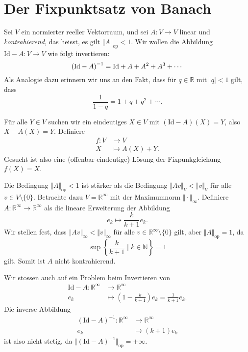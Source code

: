 \documentclass[../main.tex]{subfiles}
\begin{document}
\section{Der Fixpunktsatz von Banach}
\begin{motivation}
  Sei $V$ ein normierter reeller Vektorraum,
  und sei $A \colon V \to V$ linear und \emph{kontrahierend},
  das heisst, es gilt
  $\Vert A \Vert_{\text{op}} < 1$.
  Wir wollen die Abbildung $\text{Id} - A \colon V \to V$ wie folgt
  invertieren:
  \[
    {(\text{Id} - A)}^{-1} = \textup{Id} + A + A^2 + A^3 + \cdots
  \]
  Als Analogie dazu erinnern wir uns an den Fakt, dass
  für $q \in \mathbb{R}$ mit $|q| < 1$ gilt, dass
  \[
    \frac{1}{1-q} = 1 + q + q^2 + \cdots.
  \]

  Für alle $Y \in V$ suchen wir ein eindeutiges $X \in V$
  mit $(\text{Id} - A)(X) = Y$, also
  $X - A(X) = Y$.
  Definiere
  \begin{align*}
    f \colon V & \to V \\
    X & \mapsto A(X) + Y.
  \end{align*}
  Gesucht ist also eine (offenbar eindeutige) Lösung
  der Fixpunkgleichung $f(X) = X$.
\end{motivation}

\begin{remark}
  Die Bedingung $\Vert A \Vert_{\text{op}} < 1$ ist stärker als die
  Bedingung $\Vert A v \Vert_V < \Vert v \Vert_V$ für alle $v
  \in V \setminus \{0\}$.
  Betrachte dazu $V = \mathbb{R}^{\infty}$ mit der Maximumnorm
  $\Vert \cdot \Vert_{\infty}$.
  Definiere $A \colon \mathbb{R}^{\infty} \to \mathbb{R}^{\infty}$
  als die lineare Erweiterung der Abbildung
  \[
    e_k \mapsto \frac{k}{k+1}e_k.
  \]
  Wir stellen fest, dass $\Vert A v \Vert_{\infty} < \Vert v \Vert_{\infty}$
  für alle $v \in \mathbb{R}^{\infty} \setminus \{0\}$ gilt,
  aber $\Vert A \Vert_{\text{op}} = 1$, da
  \[
    \sup \left\{\frac{k}{k+1} \mid k \in \mathbb{N}\right\} = 1
  \]
  gilt. Somit ist $A$ nicht kontrahierend.

  Wir stossen auch auf ein Problem beim Invertieren von
  \begin{align*}
    \text{Id} - A \colon \mathbb{R}^{\infty} & \to \mathbb{R}^{\infty} \\
    e_k & \mapsto \left( 1 - \frac{k}{k+1} \right)e_k
    = \frac{1}{k+1}e_k.
  \end{align*}
  Die inverse Abbildung
  \begin{align*}
    {(\text{Id} - A)}^{-1} \colon \mathbb{R}^{\infty} & \to \mathbb{R}^{\infty} \\
    e_k & \mapsto (k+1) e_k
  \end{align*}
  ist also nicht stetig, da $\Vert {(\text{Id} - A)}^{-1} \Vert_{\text{op}}
  = +\infty$.
\end{remark}
\end{document}
